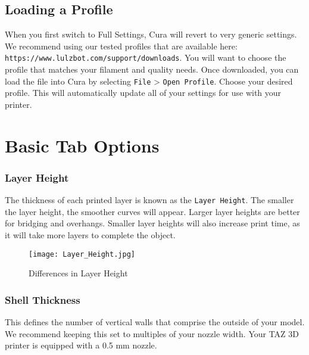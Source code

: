 \subsection{Loading a Profile}
When you first switch to Full Settings, Cura will revert to very generic settings. We recommend using our tested profiles that are available here: \texttt{https://www.lulzbot.com/support/downloads}. You will want to choose the profile that matches your filament and quality needs. Once downloaded, you can load the file into Cura by selecting \texttt{File} > \texttt{Open Profile}. Choose your desired profile. This will automatically update all of your settings for use with your printer.

\section{Basic Tab Options}

\subsubsection{Layer Height}
The thickness of each printed layer is known as the \texttt{Layer Height}. The smaller the layer height, the smoother curves will appear. Larger layer heights are better for bridging and overhangs. Smaller layer heights will also increase print time, as it will take more layers to complete the object.
\begin{figure}[H]
\centering
\texttt{[image: Layer\_Height.jpg]}
\caption{Differences in Layer Height}
\label{fig:Differences in Layer Height}
\end{figure}


\subsubsection{Shell Thickness}
This defines the number of vertical walls that comprise the outside of your model. We recommend keeping this set to multiples of your nozzle width. Your TAZ 3D printer is equipped with a 0.5 mm nozzle. %

